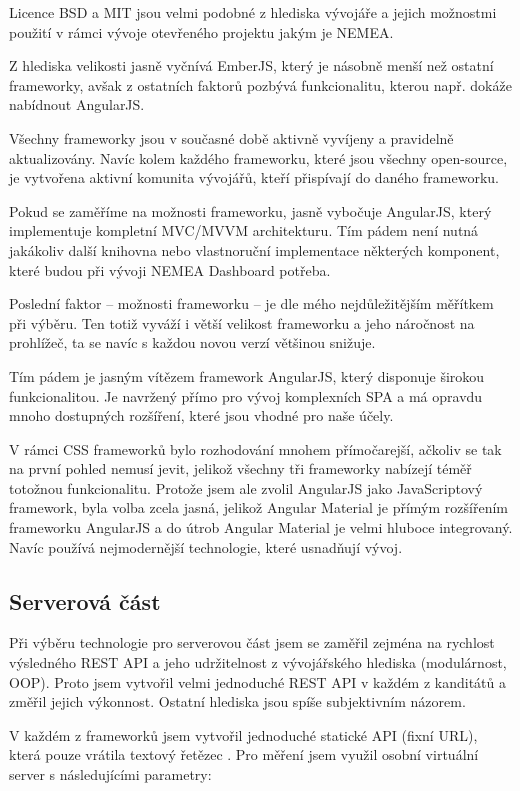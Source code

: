 Licence BSD a MIT jsou velmi podobné z hlediska vývojáře a jejich možnostmi použití v rámci vývoje otevřeného projektu jakým je NEMEA.

Z hlediska velikosti jasně vyčnívá EmberJS, který je násobně menší než ostatní frameworky, avšak z ostatních faktorů pozbývá funkcionalitu, kterou např. dokáže nabídnout AngularJS.

Všechny frameworky jsou v současné době aktivně vyvíjeny a pravidelně aktualizovány. Navíc kolem každého frameworku, které jsou všechny open-source, je vytvořena aktivní komunita vývojářů, kteří přispívají do daného frameworku.

Pokud se zaměříme na možnosti frameworku, jasně vybočuje AngularJS, který implementuje kompletní MVC/MVVM architekturu. Tím pádem není nutná jakákoliv další knihovna nebo vlastnoruční implementace některých komponent, které budou při vývoji NEMEA Dashboard potřeba.

Poslední faktor -- možnosti frameworku -- je dle mého nejdůležitějším měřítkem při výběru. Ten totiž vyváží i větší velikost frameworku a jeho náročnost na prohlížeč, ta se navíc s každou novou verzí většinou snižuje.

Tím pádem je jasným vítězem framework AngularJS, který disponuje širokou funkcionalitou. Je navržený přímo pro vývoj komplexních SPA a má opravdu mnoho dostupných rozšíření, které jsou vhodné pro naše účely.

V rámci CSS frameworků bylo rozhodování mnohem přímočarejší, ačkoliv se tak na první pohled nemusí jevit, jelikož všechny tři frameworky nabízejí téměř totožnou funkcionalitu. Protože jsem ale zvolil AngularJS jako JavaScriptový framework, byla volba zcela jasná, jelikož Angular Material je přímým rozšířením frameworku AngularJS a do útrob Angular Material je velmi hluboce integrovaný. Navíc používá nejmodernější technologie, které usnadňují vývoj.

\subsection{Serverová část}

Při výběru technologie pro serverovou část jsem se zaměřil zejména na rychlost výsledného REST API a jeho udržitelnost z vývojářského hlediska (modulárnost, OOP). Proto jsem vytvořil velmi jednoduché REST API v každém z kanditátů a změřil jejich výkonnost. Ostatní hlediska jsou spíše subjektivním názorem.

V každém z frameworků jsem vytvořil jednoduché statické API (fixní URL), která pouze vrátila textový řetězec . Pro měření jsem využil osobní virtuální server s následujícími parametry:

